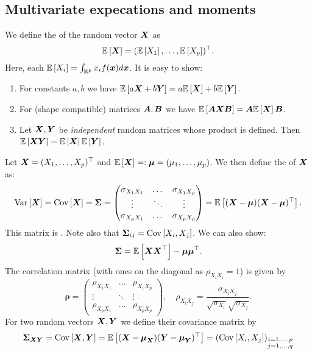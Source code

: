 \subsection{Multivariate expecations and moments}

We define the  of the random vector $\X$ as
$$
    \ev{\X} = (\ev{X_1},\dots,\ev{X_p})^\top.
$$
Here, each $\ev{X_i}=\int_{\R^p} x_i f(\x)d\x$. It is easy to show:
\begin{enumerate}
    \item For constants $a,b$ we have $\ev{a \X + b \Y} = a\ev{\X}+ b \ev{\Y}$.
    \item For (shape compatible) matrices $\mA, \mB$ we have
    $
        \ev{\mA\X \mB} = \mA\ev{\X}\mB
    $.
    \item Let $\X, \Y$ be \emph{independent} random matrices whose product is defined. Then $\ev{\X\Y} = \ev{\X}\ev{\Y}$.   
\end{enumerate}        

Let $\X=(X_1,\dots,X_p)^\top$ and $\ev{\X}=:\M=({\mu_1,\dots,\mu_p})$. We then define the  of $\X$ as:
$$
    \var{\X} = \cov{\X} = \SS = \begin{pmatrix}
        \sigma_{X_1X_1} & \dots & \sigma_{X_1X_p} \\
        \vdots & \ddots & \vdots \\
        \sigma_{X_pX_1} & \dots & \sigma_{X_pX_p}
    \end{pmatrix}
    =\ev{(\X-\M)(\X-\M)^\top}.
$$
This matrix is . Note also that $\SS_{ij}=\cov{X_i, X_j}$. We can also show:
$$
    \SS = \ev{\X\X^\top} - \M\M^\top.
$$
The correlation matrix (with ones on the diagonal as $\rho_{X_iX_i}=1$) is given by
$$
    \boldsymbol{\rho}
    =
    \begin{pmatrix}
        \rho_{X_1X_1} & \dots & \rho_{X_1X_p} \\
        \vdots & \ddots & \vdots \\
        \rho_{X_pX_1} & \dots & \rho_{X_pX_p}
    \end{pmatrix}
    ,\quad
    \rho_{X_iX_j} = \frac{\sigma_{X_iX_j}}{\sqrt{\sigma_{X_i}}\sqrt{\sigma_{X_j}}}.
$$
For two random vectors $\X,\Y$ we define their covariance matrix by
$$
    \SS_{\X\Y} 
    = \cov{\X,\Y} 
    = \ev{(\X-\M_{\X})(\Y-\M_{\Y})^\top}
    =(\cov{X_i,X_j})_{\substack{i=1,\dots,p \\ j= 1,\dots,q}}
$$

